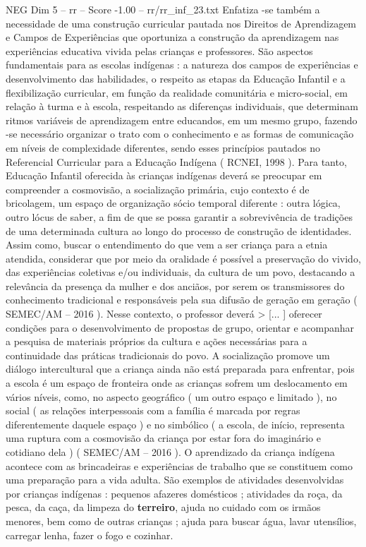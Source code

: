 \begin{textsample}{NEG Dim 5 – rr – Score -1.00 – rr/rr\_inf\_23.txt}
Enfatiza -se também a necessidade de uma construção curricular pautada nos Direitos de Aprendizagem e Campos de Experiências que oportuniza a construção da aprendizagem nas experiências educativa vivida pelas crianças e professores.
São aspectos fundamentais para as escolas indígenas : a natureza dos campos de experiências e desenvolvimento das habilidades, o respeito as etapas da Educação Infantil e a flexibilização curricular, em função da realidade comunitária e micro-social, em relação à turma e à escola, respeitando as diferenças individuais, que determinam ritmos variáveis de aprendizagem entre educandos, em um mesmo grupo, fazendo -se necessário organizar o trato com o conhecimento e as formas de comunicação em níveis de complexidade diferentes, sendo esses princípios pautados no Referencial Curricular para a Educação Indígena ( RCNEI, 1998 ).
Para tanto, Educação Infantil oferecida às crianças indígenas deverá se preocupar em compreender a cosmovisão, a socialização primária, cujo contexto é de bricolagem, um espaço de organização sócio temporal diferente : outra lógica, outro lócus de saber, a fim de que se possa garantir a sobrevivência de tradições de uma determinada cultura ao longo do processo de construção de identidades.
Assim como, buscar o entendimento do que vem a ser criança para a etnia atendida, considerar que por meio da oralidade é possível a preservação do vivido, das experiências coletivas e/ou individuais, da cultura de um povo, destacando a relevância da presença da mulher e dos anciãos, por serem os transmissores do conhecimento tradicional e responsáveis pela sua difusão de geração em geração ( SEMEC/AM – 2016 ).
Nesse contexto, o professor deverá > [... ] oferecer condições para o desenvolvimento de propostas de grupo, orientar e acompanhar a pesquisa de materiais próprios da cultura e ações necessárias para a continuidade das práticas tradicionais do povo.
A socialização promove um diálogo intercultural que a criança ainda não está preparada para enfrentar, pois a escola é um espaço de fronteira onde as crianças sofrem um deslocamento em vários níveis, como, no aspecto geográfico ( um outro espaço e limitado ), no social ( as relações interpessoais com a família é marcada por regras diferentemente daquele espaço ) e no simbólico ( a escola, de início, representa uma ruptura com a cosmovisão da criança por estar fora do imaginário e cotidiano dela ) ( SEMEC/AM – 2016 ).
O aprendizado da criança indígena acontece com as brincadeiras e experiências de trabalho que se constituem como uma preparação para a vida adulta.
São exemplos de atividades desenvolvidas por crianças indígenas : pequenos afazeres domésticos ; atividades da roça, da pesca, da caça, da limpeza do \textbf{terreiro}, ajuda no cuidado com os irmãos menores, bem como de outras crianças ; ajuda para buscar água, lavar utensílios, carregar lenha, fazer o fogo e cozinhar.

\end{textsample}
